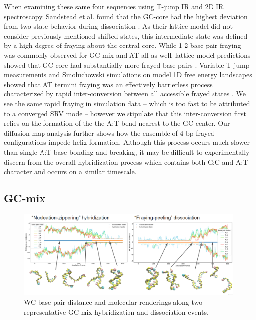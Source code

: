 \documentclass[journal=jpcbfk,manuscript=article]{achemso}
\begin{document}
When examining these same four sequences using T-jump IR and 2D IR spectroscopy, Sandstead et al. found that the GC-core had the highest deviation from two-state behavior during dissociation \citep{Sanstead2016}. As their lattice model did not consider previously mentioned shifted states, this intermediate state was defined by a high degree of fraying about the central core. While 1-2 base pair fraying was commonly observed for GC-mix and AT-all as well, lattice model predictions showed that GC-core had substantially more frayed base pairs \citep{Phys2019}. Variable T-jump measurements and Smoluchowski simulations on model 1D free energy landscapes showed that AT termini fraying was an effectively barrierless process characterized by rapid inter-conversion between all accessible frayed states \citep{Sanstead2018DirectDehybridization}. We see the same rapid fraying in simulation data -- which is too fast to be attributed to a converged SRV mode -- however we stipulate that this inter-conversion first relies on the formation of the the A:T bond nearest to the GC center. Our diffusion map analysis further shows how the ensemble of 4-bp frayed configurations impede helix formation. Although this process occurs much slower than single A:T base bonding and breaking, it may be difficult to experimentally discern from the overall hybridization process which contains both G:C and A:T character and occurs on a similar timescale.


\subsection{\label{sec:Results}GC-mix}

\begin{figure} %
	\begin{center}
        \includegraphics[width=\textwidth]{Figs/figs_0804/GC-mix_transitions.PNG}
        \caption{WC base pair distance and molecular renderings along two representative GC-mix hybridization and dissociation events.}
        \label{fig:GC-mix_transitions}
	\end{center}
\end{figure}
\end{document}

